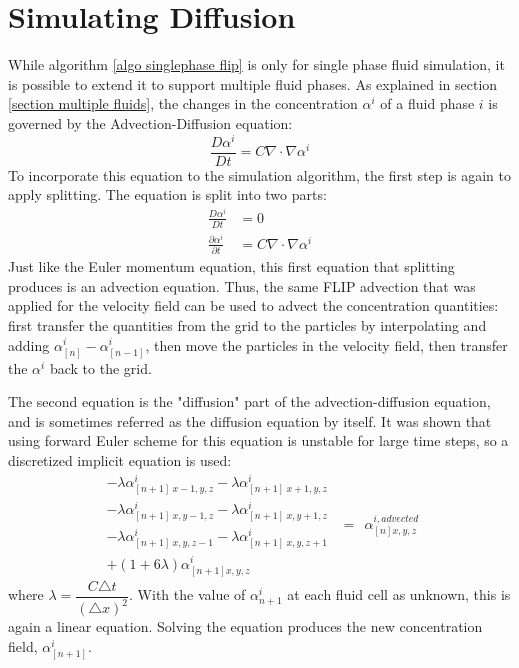 \section{Simulating Diffusion}
While algorithm \ref{algo singlephase flip} is only for single phase fluid simulation, it is possible to extend it to support multiple fluid phases. As explained in section \ref{section multiple fluids}, the changes in the concentration $\alpha^i$ of a fluid phase $i$ is governed by the Advection-Diffusion equation:
$$
\frac{D \alpha^i}{D t} = C\nabla \cdot \nabla \alpha^i
$$
To incorporate this equation to the simulation algorithm, the first step is again to apply splitting. The equation is split into two parts:
\begin{equation*}
    \begin{aligned}
        \frac{D \alpha^i}{D t} &= 0\\
        \frac{\partial \alpha^i}{\partial t} &= C\nabla \cdot \nabla \alpha^i
    \end{aligned}
\end{equation*}
Just like the Euler momentum equation, this first equation that splitting produces is an advection equation. Thus, the same FLIP advection that was applied for the velocity field can be used to advect the concentration quantities: first transfer the quantities from the grid to the particles by interpolating and adding $\alpha^{i}_{[n]} - \alpha^{i}_{[n-1]}$, then move the particles in the velocity field, then transfer the $\alpha^i$ back to the grid. 

The second equation is the "diffusion" part of the advection-diffusion equation, and is sometimes referred as the diffusion equation by itself. It was shown that using forward Euler scheme for this equation is unstable for large time steps\cite{kang2010hybrid}, so a discretized implicit equation is used:
\begin{equation*}
    \begin{aligned}
        - \lambda\alpha^i_{[n+1]~x-1,y,z}
        - \lambda\alpha^i_{[n+1]~x+1,y,z}\\
        - \lambda\alpha^i_{[n+1]~x,y-1,z}
        - \lambda\alpha^i_{[n+1]~x,y+1,z}\\
        - \lambda\alpha^i_{[n+1]~x,y,z-1}
        - \lambda\alpha^i_{[n+1]~x,y,z+1}\\
        +(1+6\lambda)\alpha^i_{[n+1] x,y,z} 
    \end{aligned}
    ~~=~~ \alpha^{i,advected}_{[n] x,y,z} 
\end{equation*}
where $\lambda = \dfrac{C\triangle t}{(\triangle x)^2}$. With the value of $\alpha^i_{n+1}$ at each fluid cell as unknown, this is again a linear equation. Solving the equation produces the new concentration field, $\alpha^i_{[n+1]}$.

